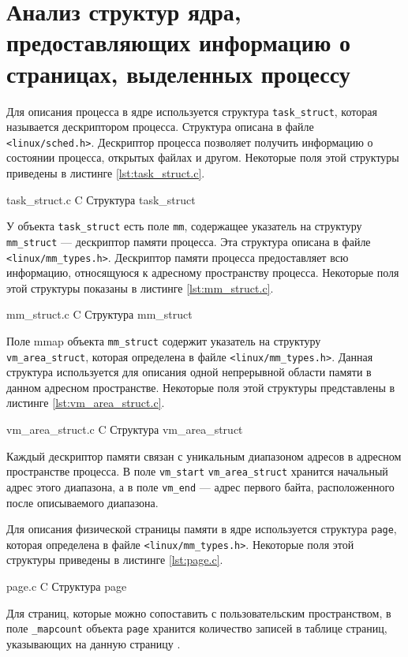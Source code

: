 \section{Анализ структур ядра, предоставляющих информацию о страницах, выделенных процессу}

Для описания процесса в ядре используется структура \texttt{task\_struct}, которая называется дескриптором процесса. Структура описана в файле \texttt{<linux/sched.h>}. Дескриптор процесса позволяет получить информацию о состоянии процесса, открытых файлах и другом. Некоторые поля этой структуры приведены в листинге \ref{lst:task_struct.c}.

    {task_struct.c}
    {C}
    {Структура task\_struct}
    
У объекта \texttt{task\_struct} есть поле \texttt{mm}, содержащее указатель на структуру \texttt{mm\_struct} --- дескриптор памяти процесса. Эта структура описана в файле \texttt{<linux/mm\_types.h>}. Дескриптор памяти процесса предоставляет всю информацию, относящуюся к адресному пространству процесса. Некоторые поля этой структуры показаны в листинге \ref{lst:mm_struct.c}.

\newpage

    {mm_struct.c}
    {C}
    {Структура mm\_struct}
    
Поле mmap объекта \texttt{mm\_struct} содержит указатель на структуру \texttt{vm\_area\_struct}, которая определена в файле \texttt{<linux/mm\_types.h>}. Данная структура используется для описания одной непрерывной области памяти в данном адресном пространстве. Некоторые поля этой структуры представлены в листинге \ref{lst:vm_area_struct.c}.
    
    {vm_area_struct.c}
    {C}
    {Структура vm\_area\_struct}

Каждый дескриптор памяти связан с уникальным диапазоном адресов в адресном пространстве процесса. В поле \texttt{vm\_start} \texttt{vm\_area\_struct} хранится начальный адрес этого диапазона, а в поле \texttt{vm\_end} --- адрес первого байта, расположенного после описываемого диапазона.

Для описания физической страницы памяти в ядре используется структура \texttt{page}, которая определена в файле \texttt{<linux/mm\_types.h>}. Некоторые поля этой структуры приведены в листинге \ref{lst:page.c}.

    {page.c}
    {C}
    {Структура page}

Для страниц, которые можно сопоставить с пользовательским пространством, в поле \texttt{\_mapcount} объекта \texttt{page} хранится количество записей в таблице страниц, указывающих на данную страницу \cite{oracle}.

